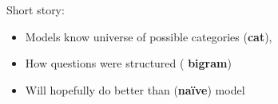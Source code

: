 
\vspace{-4cm}

  \begin{block}{Short story:}
    \begin{itemize}
      \item Models know universe of possible categories ({\bf cat}),
    \item How questions were structured ({\bf
      bigram})
    \item Will hopefully do better than ({\bf na\"ive}) model
      \end{itemize}
    \end{block}